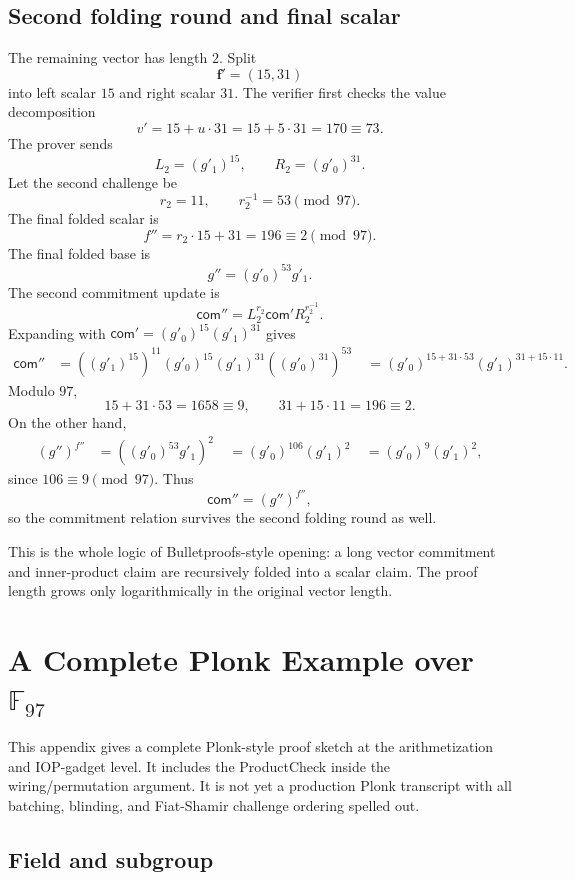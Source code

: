 \documentclass[11pt]{article}
\newcommand{\F}{\mathbb{F}}
\begin{document}
\subsection{Second folding round and final scalar}

The remaining vector has length $2$. Split
\[
    \mathbf f'=(15,31)
\]
into left scalar $15$ and right scalar $31$. The verifier first checks the value decomposition
\[
    v'=15+u\cdot31=15+5\cdot31=170\equiv73.
\]
The prover sends
\[
    L_2=(g'_1)^{15},
    \qquad
    R_2=(g'_0)^{31}.
\]
Let the second challenge be
\[
    r_2=11,
    \qquad
    r_2^{-1}=53\pmod{97}.
\]
The final folded scalar is
\[
    f''=r_2\cdot15+31=196\equiv2\pmod{97}.
\]
The final folded base is
\[
    g''=(g'_0)^{53}g'_1.
\]
The second commitment update is
\[
    \mathsf{com}''=L_2^{r_2}\mathsf{com}'R_2^{r_2^{-1}}.
\]
Expanding with $\mathsf{com}'=(g'_0)^{15}(g'_1)^{31}$ gives
\[
\begin{aligned}
\mathsf{com}''
&=((g'_1)^{15})^{11}(g'_0)^{15}(g'_1)^{31}((g'_0)^{31})^{53}\
&=(g'_0)^{15+31\cdot 53}(g'_1)^{31+15\cdot 11}.
\end{aligned}
\]
Modulo $97$,
\[
    15+31\cdot53=1658\equiv 9,
    \qquad
    31+15\cdot11=196\equiv2.
\]
On the other hand,
\[
\begin{aligned}
(g'')^{f''}
&=((g'_0)^{53}g'_1)^2\
&=(g'_0)^{106}(g'_1)^2\
&=(g'_0)^9(g'_1)^2,
\end{aligned}
\]
since $106\equiv9\pmod{97}$. Thus
\[
    \mathsf{com}''=(g'')^{f''},
\]
so the commitment relation survives the second folding round as well.

This is the whole logic of Bulletproofs-style opening: a long vector commitment and inner-product claim are recursively folded into a scalar claim. The proof length grows only logarithmically in the original vector length.

\section{A Complete Plonk Example over \texorpdfstring{$\F_{97}$}{F97}}

This appendix gives a complete Plonk-style proof sketch at the arithmetization and IOP-gadget level. It includes the ProductCheck inside the wiring/permutation argument. It is not yet a production Plonk transcript with all batching, blinding, and Fiat-Shamir challenge ordering spelled out.

\subsection{Field and subgroup}
\end{document}
